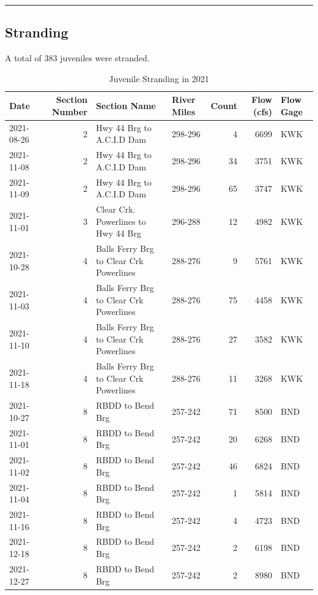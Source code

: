 \documentclass[
]{book}
\theoremstyle{definition}
\theoremstyle{definition}
\theoremstyle{definition}
\theoremstyle{definition}
\theoremstyle{remark}
\begin{document}
\begin{center}\rule{0.5\linewidth}{0.5pt}\end{center}

\hypertarget{stranding}{%
\subsection{Stranding}\label{stranding}}

A total of 383 juveniles were stranded.

\begin{table}
\centering
\caption{Juvenile Stranding in 2021}
\centering
\begin{tabular}[t]{lrllrrl}
\hline
Date & Section Number & Section Name & River Miles & Count & Flow (cfs) & Flow Gage\\
\hline
2021-08-26 & 2 & Hwy 44 Brg to A.C.I.D Dam & 298-296 & 4 & 6699 & KWK\\
\hline
2021-11-08 & 2 & Hwy 44 Brg to A.C.I.D Dam & 298-296 & 34 & 3751 & KWK\\
\hline
2021-11-09 & 2 & Hwy 44 Brg to A.C.I.D Dam & 298-296 & 65 & 3747 & KWK\\
\hline
2021-11-01 & 3 & Clear Crk. Powerlines to Hwy 44 Brg & 296-288 & 12 & 4982 & KWK\\
\hline
2021-10-28 & 4 & Balls Ferry Brg to Clear Crk Powerlines & 288-276 & 9 & 5761 & KWK\\
\hline
2021-11-03 & 4 & Balls Ferry Brg to Clear Crk Powerlines & 288-276 & 75 & 4458 & KWK\\
\hline
2021-11-10 & 4 & Balls Ferry Brg to Clear Crk Powerlines & 288-276 & 27 & 3582 & KWK\\
\hline
2021-11-18 & 4 & Balls Ferry Brg to Clear Crk Powerlines & 288-276 & 11 & 3268 & KWK\\
\hline
2021-10-27 & 8 & RBDD to Bend Brg & 257-242 & 71 & 8500 & BND\\
\hline
2021-11-01 & 8 & RBDD to Bend Brg & 257-242 & 20 & 6268 & BND\\
\hline
2021-11-02 & 8 & RBDD to Bend Brg & 257-242 & 46 & 6824 & BND\\
\hline
2021-11-04 & 8 & RBDD to Bend Brg & 257-242 & 1 & 5814 & BND\\
\hline
2021-11-16 & 8 & RBDD to Bend Brg & 257-242 & 4 & 4723 & BND\\
\hline
2021-12-18 & 8 & RBDD to Bend Brg & 257-242 & 2 & 6198 & BND\\
\hline
2021-12-27 & 8 & RBDD to Bend Brg & 257-242 & 2 & 8980 & BND\\
\hline
\end{tabular}
\end{table}
\end{document}
